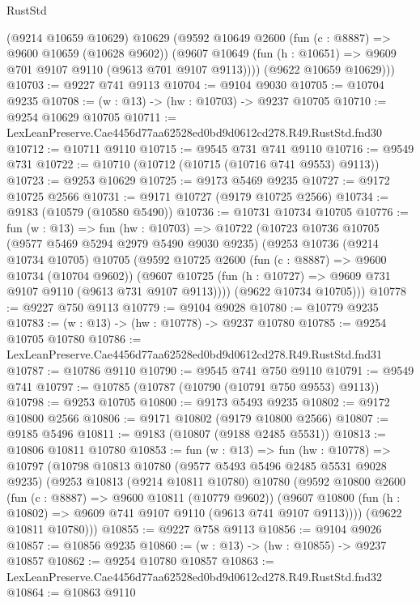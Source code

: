 \begin{lexlean}{RustStd}
\begin{coremodule}
        (@9214 @10659 @10629)
        @10629
        (@9592
          @10649
          @2600
          (fun (c : @8887) => @9600 @10659 (@10628 @9602))
          (@9607 @10649 (fun (h : @10651) => @9609 @701 @9107 @9110 (@9613 @701 @9107 @9113))))
        (@9622 @10659 @10629)))
@10703 := @9227 @741 @9113
@10704 := @9104 @9030
@10705 := @10704 @9235
@10708 := (w : @13) -> (hw : @10703) -> @9237 @10705
@10710 := @9254 @10629 @10705
@10711 := LexLeanPreserve.Cae4456d77aa62528ed0bd9d0612cd278.R49.RustStd.fnd30
@10712 := @10711 @9110
@10715 := @9545 @731 @741 @9110
@10716 := @9549 @731
@10722 := @10710 (@10712 (@10715 (@10716 @741 @9553) @9113))
@10723 := @9253 @10629
@10725 := @9173 @5469 @9235
@10727 := @9172 @10725 @2566
@10731 := @9171 @10727 (@9179 @10725 @2566)
@10734 := @9183 (@10579 (@10580 @5490))
@10736 := @10731 @10734 @10705
@10776 := fun (w : @13) =>
  fun (hw : @10703) =>
  @10722
    (@10723
      @10736
      @10705
      (@9577 @5469 @5294 @2979 @5490 @9030 @9235)
      (@9253
        @10736
        (@9214 @10734 @10705)
        @10705
        (@9592
          @10725
          @2600
          (fun (c : @8887) => @9600 @10734 (@10704 @9602))
          (@9607 @10725 (fun (h : @10727) => @9609 @731 @9107 @9110 (@9613 @731 @9107 @9113))))
        (@9622 @10734 @10705)))
@10778 := @9227 @750 @9113
@10779 := @9104 @9028
@10780 := @10779 @9235
@10783 := (w : @13) -> (hw : @10778) -> @9237 @10780
@10785 := @9254 @10705 @10780
@10786 := LexLeanPreserve.Cae4456d77aa62528ed0bd9d0612cd278.R49.RustStd.fnd31
@10787 := @10786 @9110
@10790 := @9545 @741 @750 @9110
@10791 := @9549 @741
@10797 := @10785 (@10787 (@10790 (@10791 @750 @9553) @9113))
@10798 := @9253 @10705
@10800 := @9173 @5493 @9235
@10802 := @9172 @10800 @2566
@10806 := @9171 @10802 (@9179 @10800 @2566)
@10807 := @9185 @5496
@10811 := @9183 (@10807 (@9188 @2485 @5531))
@10813 := @10806 @10811 @10780
@10853 := fun (w : @13) =>
  fun (hw : @10778) =>
  @10797
    (@10798
      @10813
      @10780
      (@9577 @5493 @5496 @2485 @5531 @9028 @9235)
      (@9253
        @10813
        (@9214 @10811 @10780)
        @10780
        (@9592
          @10800
          @2600
          (fun (c : @8887) => @9600 @10811 (@10779 @9602))
          (@9607 @10800 (fun (h : @10802) => @9609 @741 @9107 @9110 (@9613 @741 @9107 @9113))))
        (@9622 @10811 @10780)))
@10855 := @9227 @758 @9113
@10856 := @9104 @9026
@10857 := @10856 @9235
@10860 := (w : @13) -> (hw : @10855) -> @9237 @10857
@10862 := @9254 @10780 @10857
@10863 := LexLeanPreserve.Cae4456d77aa62528ed0bd9d0612cd278.R49.RustStd.fnd32
@10864 := @10863 @9110

\end{coremodule}
\end{lexlean}
